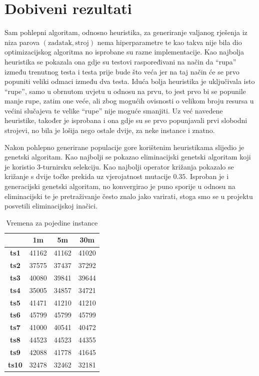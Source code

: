 \documentclass[utf8, seminar, numeric]{fer}
\begin{document}
\chapter{Dobiveni rezultati}  \label{sec:results}

Sam pohlepni algoritam, odnosno heuristika, za generiranje valjanog rješenja iz niza parova $(\text{zadatak}, \text{stroj})$ nema hiperparametre te kao takva nije bila dio optimizacijskog algoritma no isprobane su razne implementacije. Kao najbolja heuristika se pokazala ona gdje su testovi raspoređivani na način da ``rupa'' između trenutnog testa i testa prije bude što veća jer na taj način će se prvo popuniti veliki odmaci između dva testa. Iduća bolja heuristika je uključivala isto ``rupe'', samo u obrnutom uvjetu u odnosu na prvu, to jest prvo bi se popunile manje rupe, zatim one veće, ali zbog mogućih ovisnosti o velikom broju resursa u većini slučajeva te velike ``rupe'' nije moguće smanjiti. Uz već navedene heuristike, također je isprobana i ona gdje su se prvo popunjavali prvi slobodni strojevi, no bila je lošija nego ostale dvije, za neke instance i znatno.

Nakon pohlepno generirane populacije gore korištenim heuristikama slijedio je genetski algoritam. Kao najbolji se pokazao eliminacijski genetski algoritam koji je koristio $3$-turnirsku selekciju. Kao najbolji operator križanja pokazalo se križanje s dvije točke prekida uz vjerojatnost mutacije $0.35$. Isproban je i generacijski genetski algoritam, no konvergirao je puno sporije u odnosu na eliminacijski te je pretraživanje često znalo jako varirati, stoga smo se u projektu posvetili eliminacijskoj inačici.

\begin{table}
\centering
\caption{Vremena za pojedine instance}
\label{table:times}
\begin{tabular}{|c|c|c|c|}
\hline
\textbf{}     & \textbf{1m} & \textbf{5m} & \textbf{30m} \\ \hline
\textbf{ts1}  & 41162       & 41162       & 41020        \\ \hline
\textbf{ts2}  & 37575       & 37437       & 37292        \\ \hline
\textbf{ts3}  & 40080       & 39841       & 39644        \\ \hline
\textbf{ts4}  & 35005       & 34857       & 34721        \\ \hline
\textbf{ts5}  & 41471       & 41210       & 41210        \\ \hline
\textbf{ts6}  & 45799       & 45799       & 45799        \\ \hline
\textbf{ts7}  & 41000       & 40541       & 40472        \\ \hline
\textbf{ts8}  & 44523       & 44523       & 44355        \\ \hline
\textbf{ts9}  & 42088       & 41778       & 41645        \\ \hline
\textbf{ts10} & 32478       & 32462       & 32181        \\ \hline
\end{tabular}
\end{table}
\end{document}
